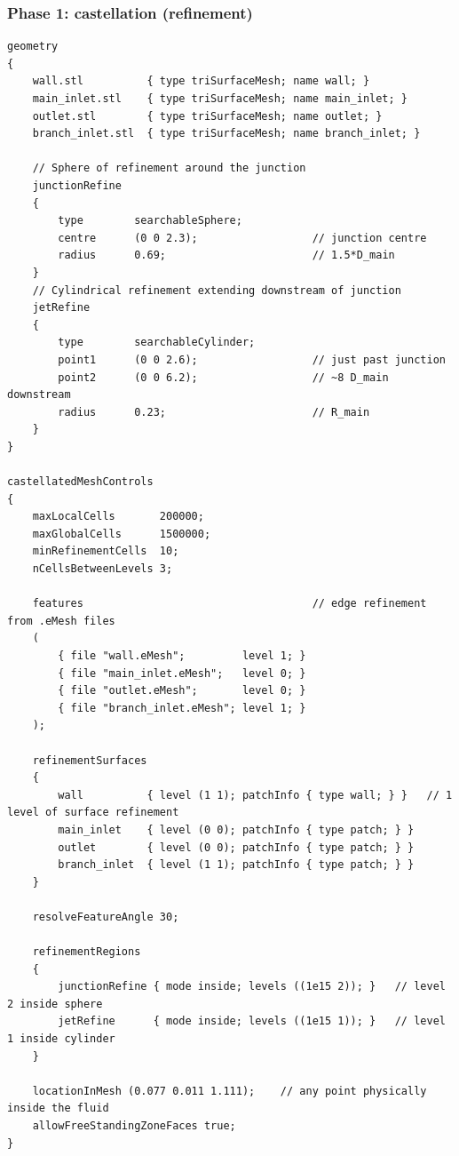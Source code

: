 \documentclass[11pt,a4paper]{article}
\begin{document}
\subsubsection{Phase 1: castellation (refinement)}

\begin{lstlisting}[style=foamstyle,caption={\texttt{snappyHexMeshDict} -- castellation}]
geometry
{
    wall.stl          { type triSurfaceMesh; name wall; }
    main_inlet.stl    { type triSurfaceMesh; name main_inlet; }
    outlet.stl        { type triSurfaceMesh; name outlet; }
    branch_inlet.stl  { type triSurfaceMesh; name branch_inlet; }

    // Sphere of refinement around the junction
    junctionRefine
    {
        type        searchableSphere;
        centre      (0 0 2.3);                  // junction centre
        radius      0.69;                       // 1.5*D_main
    }
    // Cylindrical refinement extending downstream of junction
    jetRefine
    {
        type        searchableCylinder;
        point1      (0 0 2.6);                  // just past junction
        point2      (0 0 6.2);                  // ~8 D_main downstream
        radius      0.23;                       // R_main
    }
}

castellatedMeshControls
{
    maxLocalCells       200000;
    maxGlobalCells      1500000;
    minRefinementCells  10;
    nCellsBetweenLevels 3;

    features                                    // edge refinement from .eMesh files
    (
        { file "wall.eMesh";         level 1; }
        { file "main_inlet.eMesh";   level 0; }
        { file "outlet.eMesh";       level 0; }
        { file "branch_inlet.eMesh"; level 1; }
    );

    refinementSurfaces
    {
        wall          { level (1 1); patchInfo { type wall; } }   // 1 level of surface refinement
        main_inlet    { level (0 0); patchInfo { type patch; } }
        outlet        { level (0 0); patchInfo { type patch; } }
        branch_inlet  { level (1 1); patchInfo { type patch; } }
    }

    resolveFeatureAngle 30;

    refinementRegions
    {
        junctionRefine { mode inside; levels ((1e15 2)); }   // level 2 inside sphere
        jetRefine      { mode inside; levels ((1e15 1)); }   // level 1 inside cylinder
    }

    locationInMesh (0.077 0.011 1.111);    // any point physically inside the fluid
    allowFreeStandingZoneFaces true;
}
\end{lstlisting}
\end{document}
